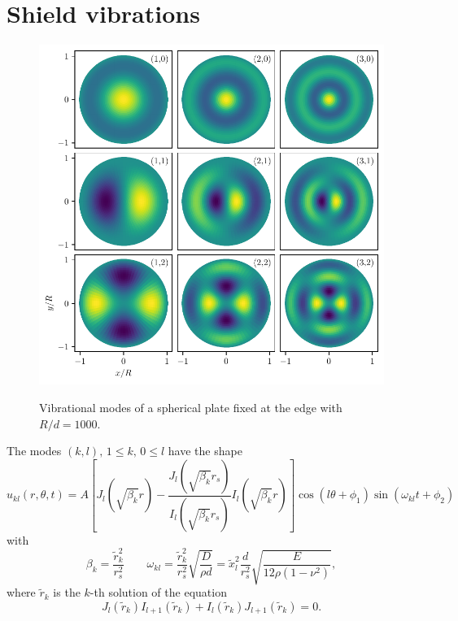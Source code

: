 \section{Shield vibrations}


\begin{figure}[!htbp]
  \centering
  \includegraphics[width=\textwidth]{./../figures/vibrations/vibrational-modes.pdf}
  \label{fig:4:vibrational-modes}
  \caption{Vibrational modes of a spherical plate fixed at the edge with $R/d = 1000$.}
\end{figure}


The modes $(k,l),\, 1 \leq k, \, 0 \leq l$ have the shape
\begin{equation}
  u_{kl}(r, \theta, t) = A\left[J_l(\sqrt{\beta_k}r) - \frac{J_l(\sqrt{\beta_k}r_s)}{I_l(\sqrt{\beta_k}r_s)}I_l(\sqrt{\beta_k}r)\right]\cos(l\theta+\phi_1)\sin(\omega_{kl}t+\phi_2)
\end{equation}
with
\begin{equation}
  \beta_k = \frac{\tilde{r}_k^2}{r_s^2} \quad \quad \omega_{kl} = \frac{\tilde{r}_k^2}{r_s^2}\sqrt{\frac{D}{\rho d}} = \tilde{x}_l^2\frac{d}{r_s^2}\sqrt{\frac{E}{12\rho(1-\nu^2)}} ,
\end{equation}
where $\tilde{r}_k$ is the $k$-th solution of the equation
\begin{equation}
  J_l(\tilde{r}_k)I_{l+1}(\tilde{r}_k)+I_l(\tilde{r}_k)J_{l+1}(\tilde{r}_k) = 0 .
\end{equation}


